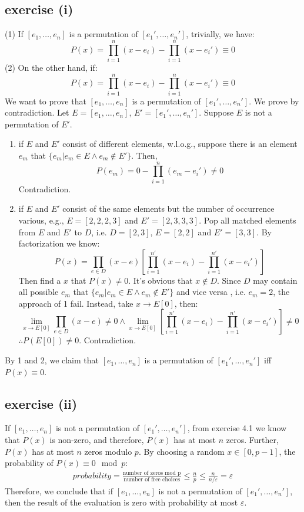 \documentclass[12pt,oneside,a4paper]{article}
\begin{document}
\subsection{exercise (i)}
(1) If $[e_1,\dots,e_{n}]$ is a permutation of $[e_1',\dots,e_{n}']$, trivially, we have:
$$
P(x) = \prod_{i=1}^{n} {(x-e_i)} - \prod_{i=1}^{n} {(x-e_i')} \equiv 0
$$
\noindent
(2) On the other hand, if: 
$$
P(x) = \prod_{i=1}^{n} {(x-e_i)} - \prod_{i=1}^{n} {(x-e_i')} \equiv 0
$$
We want to prove that $[e_1,\dots,e_{n}]$ is a permutation of $[e_1',\dots,e_{n}']$. We prove by contradiction. Let $E = [e_1,\dots,e_{n}]$, $E' = [e_1',\dots,e_{n}']$. Suppose $E$ is not a permutation of $E'$. 
\begin{enumerate}
    \item if $E$ and $E'$ consist of different elements, w.l.o.g., suppose there is an element $e_m$ that $\{  e_m| e_m \in E  \land  e_m \notin E' \} $. Then, 
    $$
    P(e_m) = 0 - \prod_{i = 1}^n {(e_m - e_i')} \neq 0
    $$
    Contradiction. 
    \item if $E$ and $E'$ consist of the same elements but the number of occurrence various, e.g., $E = [2, 2, 2, 3]$ and $E' = [2, 3, 3, 3]$. 
    Pop all matched elements from $E$ and $E'$ to $D$, i.e. $D = [2,3]$, $E = [2,2]$ and $E'=[3,3]$. 
    By factorization we know: 
    $$
    P(x) = \prod_{e \in D}(x - e) \left[ \prod_{i = 1}^{n'} {(x - e_i)} - \prod_{i = 1}^{n'} {(x - e_i')} \right]
    $$
    Then find a $x$ that $P(x) \neq 0$. It's obvious that $x \notin D$. 
    Since $D$ may contain all possible $e_m$ that $\{  e_m| e_m \in E  \land  e_m \notin E' \} $ and vice versa , i.e. $e_m = 2$, the approach of 1 fail.
    Instead, take $x \to E[0]$, then:
    $$
    \lim_{x \to E[0]}  \prod_{e \in D}(x - e) \neq 0 \land  \lim_{x \to E[0]} \left[  \prod_{i = 1}^{n'} {(x - e_i)} - \prod_{i = 1}^{n'} {(x - e_i')} \right]\neq 0 
    $$ 
    $\therefore  P(E[0]) \neq 0$. Contradiction.
\end{enumerate}
By 1 and 2, we claim that $[e_1,\dots,e_{n}]$ is a permutation of $[e_1',\dots,e_{n}']$ iff $P(x) \equiv 0$.
\subsection{exercise (ii)}
If $[e_1,\dots,e_{n}]$ is not a permutation of $[e_1',\dots,e_{n}']$, from exercise 4.1 we know that $P(x)$ is non-zero,
and therefore, $P(x)$ has at most $n$ zeros. Further, $P(x)$ has at most $n$ zeros modulo $p$. By choosing a random $x \in [0,p-1]$, the probability of $P(x) \equiv 0 \mod p$: 
\begin{align*}
    probability = \frac{\text{number of zeros mod p}}{\text{number of free choices}}\le \frac{n}{p} \le \frac{n}{n/\varepsilon} = \varepsilon
\end{align*}
Therefore, we conclude that if $[e_1,\dots,e_{n}]$ is not a permutation of $[e_1',\dots,e_{n}']$, then the result of the evaluation is zero with probability at most $\varepsilon$.
\end{document}
